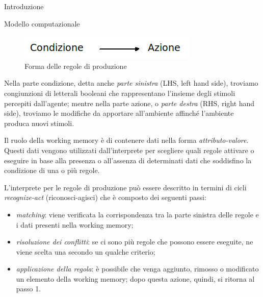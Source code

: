\begin{chapter}{Introduzione}
\begin{section}{Modello computazionale}
\begin{figure}[!htb]
	\centering
	\includegraphics[scale=1.0]{img/formaregole.png}
	\caption{Forma delle regole di produzione}
	\label{fig:formaregole}
\end{figure}

\noindent Nella parte condizione, detta anche \textit{parte sinistra} (LHS, left hand side),
troviamo congiunzioni di letterali booleani che rappresentano l'insieme degli
stimoli percepiti dall'agente; mentre nella parte azione, o \textit{parte destra}
(RHS, right hand side), troviamo le modifiche da apportare all'ambiente
affinch\'e l'ambiente produca nuovi stimoli.  

Il ruolo della working memory \`e di contenere dati nella forma
\textit{attributo-valore}. Questi dati vengono utilizzati dall'interprete per scegliere
quali regole attivare o eseguire in base alla presenza o all'assenza di determinati dati
che soddisfino la condizione di una o pi\`u regole. 

L'interprete per le regole di produzione pu\`o essere descritto in termini di cicli \textit{recognize-act} (riconosci-agisci)
che \`e composto dei seguenti passi:

\begin{itemize}
    \item \textit{matching}: viene verificata la corrispondenza tra la parte sinistra delle regole
          e i dati presenti nella working memory;
    \item \textit{risoluzione dei conflitti}: se ci sono pi\`u regole che possono essere eseguite,
          ne viene scelta una secondo un qualche criterio;
    \item \textit{applicazione della regola}: \`e possibile che venga aggiunto, rimosso o modificato
          un elemento della working memory; dopo questa azione, quindi, si ritorna al passo 1.
\end{itemize}


\end{section}
\end{chapter}
